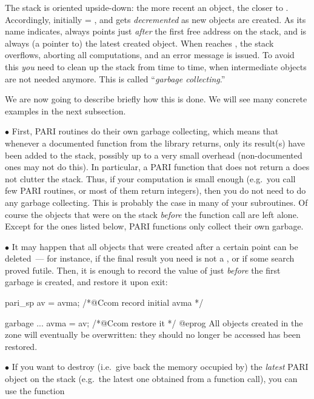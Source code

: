 The stack is oriented upside-down: the more recent an object, the closer to
. Accordingly, initially  = , and  gets
\emph{decremented} as new objects are created. As its name indicates,
 always points just \emph{after} the first free address on the
stack, and  is always (a pointer to) the latest created object.
When  reaches , the stack overflows, aborting all
computations, and an error message is issued. To avoid this \emph{you}
need to clean up the stack from time to time, when intermediate objects are
not needed anymore. This is called ``\emph{garbage collecting}.''

We are now going to describe briefly how this is done. We will see many
concrete examples in the next subsection.

\noindent$\bullet$
First, PARI routines do their own garbage collecting, which means that
whenever a documented function from the library returns, only its result(s)
have been added to the stack, possibly up to a very small overhead
(non-documented ones may not do this). In
particular, a PARI function that does not return a  does not clutter
the stack. Thus, if your computation is small enough (e.g.~you call few PARI
routines, or most of them return  integers), then you do not need
to do any garbage collecting. This is probably the case in many of your
subroutines. Of course the objects that were on the stack \emph{before} the
function call are left alone. Except for the ones listed below, PARI
functions only collect their own garbage.

\noindent$\bullet$
It may happen that all objects that were created after a certain point can
be deleted~--- for instance, if the final result you need is not a
, or if some search proved futile. Then, it is enough to record
the value of  just \emph{before} the first garbage is created,
and restore it upon exit:

\bprog
pari_sp av = avma; /*@Ccom record initial avma */

garbage ...
avma = av; /*@Ccom restore it */
@eprog
\noindent All objects created in the  zone will eventually
be overwritten: they should no longer be accessed  has been
restored.

\noindent$\bullet$
If you want to destroy (i.e.~give back the memory occupied by) the
\emph{latest} PARI object on the stack (e.g.~the latest one obtained from a
function call), you can use the function%

